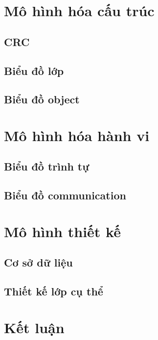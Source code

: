 \documentclass[12pt]{report}
\begin{document}
\section{Mô hình hóa cấu trúc}

\subsection{CRC}
\renewcommand{\arraystretch}{1.5}



\subsection{Biểu đồ lớp}
\subsection{Biểu đồ object}

\section{Mô hình hóa hành vi}
\subsection{Biểu đồ trình tự}
\subsection{Biểu đồ communication}

\section{Mô hình thiết kế}
\subsection{Cơ sở dữ liệu}
\subsection{Thiết kế lớp cụ thể}

\section{Kết luận}
\end{document}
